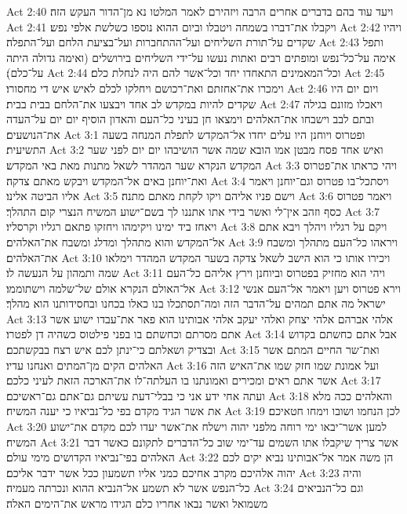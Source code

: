 Act 2:40  ויעד עוד בהם בדברים אחרים הרבה ויזהירם לאמר המלטו נא מן־הדור העקש הזה׃
Act 2:41  ויקבלו את־דברו בשמחה ויטבלו וביום ההוא נוספו כשלשת אלפי נפש׃
Act 2:42  ויהיו שקדים על־תורת השליחים ועל־ההתחברות ועל־בציעת הלחם ועל־התפלה׃
Act 2:43  ותפל אימה על־כל־נפש ומופתים רבים ואתות נעשו על־ידי השליחים בירושלים (ואימה גדולה היתה על־כלם)׃
Act 2:44  וכל־המאמינים התאחדו יחד וכל־אשר להם היה לנחלת כלם׃
Act 2:45  וימכרו את־אחזתם ואת־רכושם ויחלקו לכלם לאיש איש די מחסורו׃
Act 2:46  ויום יום היו שקדים להיות במקדש לב אחד ויבצעו את־הלחם בבית בבית׃
Act 2:47  ויאכלו מזונם בגילה ובתם לבב וישבחו את־האלהים וימצאו חן בעיני כל־העם והאדון הוסיף יום יום על־העדה את־הנושעים׃
Act 3:1  ופטרוס ויוחנן היו עלים יחדו אל־המקדש לתפלת המנחה בשעה התשיעית׃
Act 3:2  ואיש אחד פסח מבטן אמו הובא שמה אשר הושיבהו יום יום לפני שער המקדש הנקרא שער המהדר לשאל מתנות מאת באי המקדש׃
Act 3:3  ויהי כראתו את־פטרוס ואת־יוחנן באים אל־המקדש ויבקש מאתם צדקה׃
Act 3:4  ויסתכל־בו פטרוס וגם־יוחנן ויאמר אליו הביטה אלינו׃
Act 3:5  וישם פניו אליהם ויקו לקחת מאתם מתנה׃
Act 3:6  ויאמר פטרוס כסף וזהב אין־לי ואשר בידי אתו אתננו לך בשם־ישוע המשיח הנצרי קום התהלך׃
Act 3:7  ויאחז ביד ימינו ויקימהו ויחזקו פתאם רגליו וקרסליו׃
Act 3:8  ויקם על רגליו ויהלך ויבא אתם אל־המקדש והוא מתהלך ומדלג ומשבח את־האלהים׃
Act 3:9  ויראהו כל־העם מתהלך ומשבח את־האלהים׃
Act 3:10  ויכירו אותו כי הוא הישב לשאל צדקה בשער המקדש המהדר וימלאו שמה ותמהון על הנעשה לו׃
Act 3:11  ויהי הוא מחזיק בפטרוס וביוחנן וירץ אליהם כל־העם אל־האולם הנקרא אולם של־שלמה וישתוממו׃
Act 3:12  וירא פטרוס ויען ויאמר אל־העם אנשי ישראל מה אתם תמהים על־הדבר הזה ומה־תסתכלו בנו כאלו בכחנו ובחסידותנו הוא מהלך׃
Act 3:13  אלהי אברהם אלהי יצחק ואלהי יעקב אלהי אבותינו הוא פאר את־עבדו ישוע אשר אתם מסרתם וכחשתם בו בפני פילטוס כשהיה דן לפטרו׃
Act 3:14  אבל אתם כחשתם בקדוש ובצדיק ושאלתם כי־ינתן לכם איש רצח בבקשתכם׃
Act 3:15  ואת־שר החיים המתם אשר האלהים הקים מן־המתים ואנחנו עדיו׃
Act 3:16  ועל אמונת שמו חזק שמו את־האיש הזה אשר אתם ראים ומכירים ואמונתנו בו העלתה־לו את־הארכה הזאת לעיני כלכם׃
Act 3:17  ועתה אחי ידע אני כי בבלי־דעת עשיתם גם־אתם גם־ראשיכם׃
Act 3:18  והאלהים ככה מלא את אשר הגיד מקדם בפי כל־נביאיו כי יענה המשיח׃
Act 3:19  לכן הנחמו ושובו וימחו חטאיכם׃
Act 3:20  למען אשר־יבאו ימי רוחה מלפני יהוה וישלח את־אשר יעדו לכם מקדם את־ישוע המשיח׃
Act 3:21  אשר צריך שיקבלו אתו השמים עד־ימי שוב כל־הדברים לתקונם כאשר דבר האלהים בפי־נביאיו הקדושים מימי עולם׃
Act 3:22  הן משה אמר אל־אבותינו נביא יקים לכם יהוה אלהיכם מקרב אחיכם כמני אליו תשמעון ככל אשר ידבר אליכם׃
Act 3:23  והיה כל־הנפש אשר לא תשמע אל־הנביא ההוא ונכרתה מעמיה׃
Act 3:24  וגם כל־הנביאים משמואל ואשר נבאו אחריו כלם הגידו מראש את־הימים האלה׃
